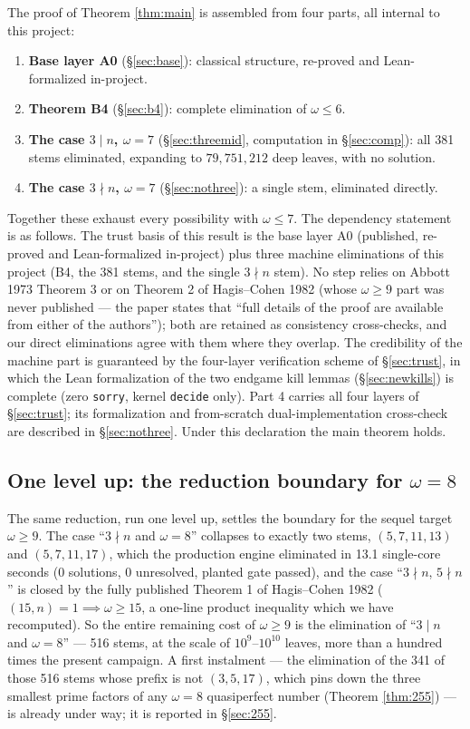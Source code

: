 \documentclass[11pt]{article}
\theoremstyle{remark}
\begin{document}
The proof of Theorem \ref{thm:main} is assembled from four parts, all internal to this project:
\begin{enumerate}
\item \textbf{Base layer A0} (\S\ref{sec:base}): classical structure, re-proved and Lean-formalized in-project.
\item \textbf{Theorem B4} (\S\ref{sec:b4}): complete elimination of $\omega \le 6$.
\item \textbf{The case $3 \mid n$, $\omega = 7$} (\S\ref{sec:threemid}, computation in \S\ref{sec:comp}): all 381 stems eliminated, expanding to $79{,}751{,}212$ deep leaves, with no solution.
\item \textbf{The case $3 \nmid n$, $\omega = 7$} (\S\ref{sec:nothree}): a single stem, eliminated directly.
\end{enumerate}
Together these exhaust every possibility with $\omega \le 7$. The dependency statement is as follows. The trust basis of this result is the base layer A0 (published, re-proved and Lean-formalized in-project) plus three machine eliminations of this project (B4, the 381 stems, and the single $3 \nmid n$ stem). No step relies on Abbott 1973 Theorem 3 or on Theorem 2 of Hagis--Cohen 1982 (whose $\omega \ge 9$ part was never published --- the paper states that ``full details of the proof are available from either of the authors''); both are retained as consistency cross-checks, and our direct eliminations agree with them where they overlap. The credibility of the machine part is guaranteed by the four-layer verification scheme of \S\ref{sec:trust}, in which the Lean formalization of the two endgame kill lemmas (\S\ref{sec:newkills}) is complete (zero \texttt{sorry}, kernel \texttt{decide} only). Part 4 carries all four layers of \S\ref{sec:trust}; its formalization and from-scratch dual-implementation cross-check are described in \S\ref{sec:nothree}. Under this declaration the main theorem holds.

\subsection{One level up: the reduction boundary for $\omega = 8$}\label{sec:red8}

The same reduction, run one level up, settles the boundary for the sequel target $\omega \ge 9$. The case ``$3 \nmid n$ and $\omega = 8$'' collapses to exactly two stems, $(5,7,11,13)$ and $(5,7,11,17)$, which the production engine eliminated in 13.1 single-core seconds (0 solutions, 0 unresolved, planted gate passed), and the case ``$3 \nmid n$, $5 \nmid n$'' is closed by the fully published Theorem 1 of Hagis--Cohen 1982 ($(15,n)=1 \implies \omega \ge 15$, a one-line product inequality which we have recomputed). So the entire remaining cost of $\omega \ge 9$ is the elimination of ``$3 \mid n$ and $\omega = 8$'' --- 516 stems, at the scale of $10^9$--$10^{10}$ leaves, more than a hundred times the present campaign. A first instalment --- the elimination of the 341 of those 516 stems whose prefix is not $(3,5,17)$, which pins down the three smallest prime factors of any $\omega = 8$ quasiperfect number (Theorem \ref{thm:255}) --- is already under way; it is reported in \S\ref{sec:255}.
\end{document}
